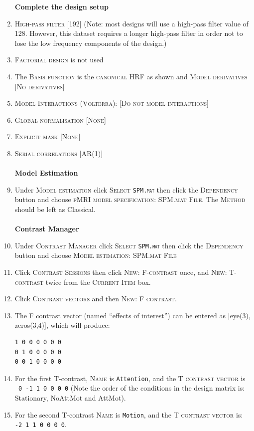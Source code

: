 \begin{enumerate}
\textbf{Complete the design setup}
\item \textsc{High-pass filter} [192] (Note: most designs will use a high-pass filter value of 128. However, this dataset requires a longer high-pass filter in order not to lose the low frequency components of the design.)
\item \textsc{Factorial design} is not used
\item The \textsc{Basis function} is the \textsc{canonical HRF} as shown and \textsc{Model derivatives} [\textsc{No derivatives}]
\item \textsc{Model Interactions (Volterra)}: [\textsc{Do not model interactions}]
\item \textsc{Global normalisation} [\textsc{None}]
\item \textsc{Explicit mask} [\textsc{None}]
\item \textsc{Serial correlations} [\textsc{AR(1)}]\\\\

\textbf{Model Estimation}
\item Under \textsc{Model estimation} click \textsc{Select \texttt{SPM.mat}} then click the \textsc{Dependency} button and choose \textsc{fMRI model specification: SPM.mat File}. The \textsc{Method} should be left as Classical.\\\\

\textbf{Contrast Manager}
\item Under \textsc{Contrast Manager} click \textsc{Select \texttt{SPM.mat}} then click the \textsc{Dependency} button and choose \textsc{Model estimation: SPM.mat File}

\item Click \textsc{Contrast Sessions} then click \textsc{New: F-contrast} once, and \textsc{New: T-contrast} twice from the \textsc{Current Item} box.
\item Click \textsc{Contrast vectors} and then \textsc{New: F contrast}. 
\item The F contrast vector (named ``effects of interest'') can be entered as [eye(3), zeros(3,4)], which will produce:
\begin{verbatim}
1 0 0 0 0 0 0
0 1 0 0 0 0 0
0 0 1 0 0 0 0
\end{verbatim}

\item For the first T-contrast, \textsc{Name} is \texttt{Attention}, and the \textsc{T contrast vector} is \texttt{~0~-1~1~0~0~0~0} (Note the order of the conditions in the design matrix is: Stationary, NoAttMot and AttMot).
\item For the second T-contrast \textsc{Name} is \texttt{Motion}, and the \textsc{T contrast vector} is: \texttt{-2~1~1~0~0~0~0}.


\end{enumerate}
